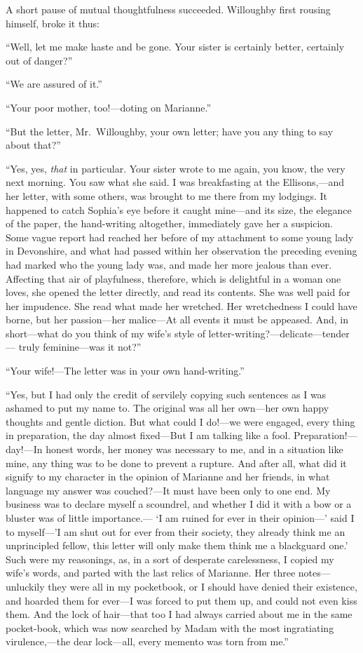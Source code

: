 \documentclass{article}
\begin{document}
A short pause of mutual thoughtfulness succeeded.
Willoughby first rousing himself, broke it thus:

``Well, let me make haste and be gone.  Your sister
is certainly better, certainly out of danger?''

``We are assured of it.''

``Your poor mother, too!---doting on Marianne.''

``But the letter, Mr.\ Willoughby, your own letter;
have you any thing to say about that?''

``Yes, yes, \emph{that} in particular.  Your sister
wrote to me again, you know, the very next morning.
You saw what she said.  I was breakfasting at the
Ellisons,---and her letter, with some others, was brought
to me there from my lodgings.  It happened to catch
Sophia's eye before it caught mine---and its size,
the elegance of the paper, the hand-writing altogether,
immediately gave her a suspicion.  Some vague report had
reached her before of my attachment to some young lady
in Devonshire, and what had passed within her observation
the preceding evening had marked who the young lady was,
and made her more jealous than ever.  Affecting that air
of playfulness, therefore, which is delightful in a woman
one loves, she opened the letter directly, and read
its contents.  She was well paid for her impudence.
She read what made her wretched.  Her wretchedness I could
have borne, but her passion---her malice---At all events it
must be appeased.  And, in short---what do you think of my
wife's style of letter-writing?---delicate---tender---%
truly feminine---was it not?''

``Your wife!---The letter was in your own hand-writing.''

``Yes, but I had only the credit of servilely copying
such sentences as I was ashamed to put my name to.
The original was all her own---her own happy thoughts
and gentle diction.  But what could I do!---we were engaged,
every thing in preparation, the day almost fixed---But I am
talking like a fool.  Preparation!---day!---In honest words,
her money was necessary to me, and in a situation like
mine, any thing was to be done to prevent a rupture.
And after all, what did it signify to my character
in the opinion of Marianne and her friends, in what language
my answer was couched?---It must have been only to one end.
My business was to declare myself a scoundrel, and whether
I did it with a bow or a bluster was of little importance.---%
`I am ruined for ever in their opinion---' said I to
myself---'I am shut out for ever from their society,
they already think me an unprincipled fellow, this letter
will only make them think me a blackguard one.' Such were
my reasonings, as, in a sort of desperate carelessness,
I copied my wife's words, and parted with the last relics
of Marianne.  Her three notes---unluckily they were all
in my pocketbook, or I should have denied their existence,
and hoarded them for ever---I was forced to put them up,
and could not even kiss them.  And the lock of hair---that too
I had always carried about me in the same pocket-book,
which was now searched by Madam with the most ingratiating
virulence,---the dear lock---all, every memento was torn from me.''
\end{document}
